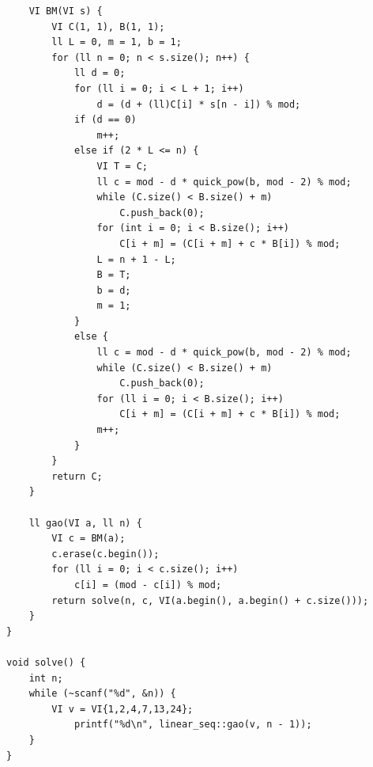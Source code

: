 \documentclass[twoside]{article}
\begin{document}
\begin{lstlisting}
    VI BM(VI s) {
        VI C(1, 1), B(1, 1);
        ll L = 0, m = 1, b = 1;
        for (ll n = 0; n < s.size(); n++) {
            ll d = 0;
            for (ll i = 0; i < L + 1; i++)
                d = (d + (ll)C[i] * s[n - i]) % mod;
            if (d == 0)
                m++;
            else if (2 * L <= n) {
                VI T = C;
                ll c = mod - d * quick_pow(b, mod - 2) % mod;
                while (C.size() < B.size() + m)
                    C.push_back(0);
                for (int i = 0; i < B.size(); i++)
                    C[i + m] = (C[i + m] + c * B[i]) % mod;
                L = n + 1 - L;
                B = T;
                b = d;
                m = 1;
            }
            else {
                ll c = mod - d * quick_pow(b, mod - 2) % mod;
                while (C.size() < B.size() + m)
                    C.push_back(0);
                for (ll i = 0; i < B.size(); i++)
                    C[i + m] = (C[i + m] + c * B[i]) % mod;
                m++;
            }
        }
        return C;
    }

    ll gao(VI a, ll n) {
        VI c = BM(a);
        c.erase(c.begin());
        for (ll i = 0; i < c.size(); i++)
            c[i] = (mod - c[i]) % mod;
        return solve(n, c, VI(a.begin(), a.begin() + c.size()));
    }
}

void solve() {
    int n;
    while (~scanf("%d", &n)) {
        VI v = VI{1,2,4,7,13,24};
            printf("%d\n", linear_seq::gao(v, n - 1));
    }
}\end{lstlisting}
\end{document}

